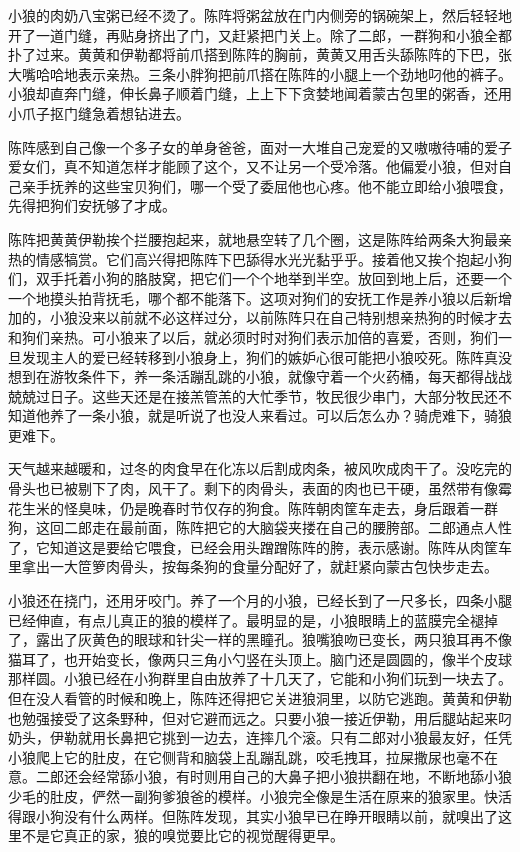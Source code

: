 \par 小狼的肉奶八宝粥已经不烫了。陈阵将粥盆放在门内侧旁的锅碗架上，然后轻轻地开了一道门缝，再贴身挤出了门，又赶紧把门关上。除了二郎，一群狗和小狼全都扑了过来。黄黄和伊勒都将前爪搭到陈阵的胸前，黄黄又用舌头舔陈阵的下巴，张大嘴哈哈地表示亲热。三条小胖狗把前爪搭在陈阵的小腿上一个劲地叼他的裤子。小狼却直奔门缝，伸长鼻子顺着门缝，上上下下贪婪地闻着蒙古包里的粥香，还用小爪子抠门缝急着想钻进去。
\par 陈阵感到自己像一个多子女的单身爸爸，面对一大堆自己宠爱的又嗷嗷待哺的爱子爱女们，真不知道怎样才能顾了这个，又不让另一个受冷落。他偏爱小狼，但对自己亲手抚养的这些宝贝狗们，哪一个受了委屈他也心疼。他不能立即给小狼喂食，先得把狗们安抚够了才成。
\par 陈阵把黄黄伊勒挨个拦腰抱起来，就地悬空转了几个圈，这是陈阵给两条大狗最亲热的情感犒赏。它们高兴得把陈阵下巴舔得水光光黏乎乎。接着他又挨个抱起小狗们，双手托着小狗的胳肢窝，把它们一个个地举到半空。放回到地上后，还要一个一个地摸头拍背抚毛，哪个都不能落下。这项对狗们的安抚工作是养小狼以后新增加的，小狼没来以前就不必这样过分，以前陈阵只在自己特别想亲热狗的时候才去和狗们亲热。可小狼来了以后，就必须时时对狗们表示加倍的喜爱，否则，狗们一旦发现主人的爱已经转移到小狼身上，狗们的嫉妒心很可能把小狼咬死。陈阵真没想到在游牧条件下，养一条活蹦乱跳的小狼，就像守着一个火药桶，每天都得战战兢兢过日子。这些天还是在接羔管羔的大忙季节，牧民很少串门，大部分牧民还不知道他养了一条小狼，就是听说了也没人来看过。可以后怎么办？骑虎难下，骑狼更难下。
\par 天气越来越暖和，过冬的肉食早在化冻以后割成肉条，被风吹成肉干了。没吃完的骨头也已被剔下了肉，风干了。剩下的肉骨头，表面的肉也已干硬，虽然带有像霉花生米的怪臭味，仍是晚春时节仅存的狗食。陈阵朝肉筐车走去，身后跟着一群狗，这回二郎走在最前面，陈阵把它的大脑袋夹搂在自己的腰胯部。二郎通点人性了，它知道这是要给它喂食，已经会用头蹭蹭陈阵的胯，表示感谢。陈阵从肉筐车里拿出一大笸箩肉骨头，按每条狗的食量分配好了，就赶紧向蒙古包快步走去。
\par 小狼还在挠门，还用牙咬门。养了一个月的小狼，已经长到了一尺多长，四条小腿已经伸直，有点儿真正的狼的模样了。最明显的是，小狼眼睛上的蓝膜完全褪掉了，露出了灰黄色的眼球和针尖一样的黑瞳孔。狼嘴狼吻已变长，两只狼耳再不像猫耳了，也开始变长，像两只三角小勺竖在头顶上。脑门还是圆圆的，像半个皮球那样圆。小狼已经在小狗群里自由放养了十几天了，它能和小狗们玩到一块去了。但在没人看管的时候和晚上，陈阵还得把它关进狼洞里，以防它逃跑。黄黄和伊勒也勉强接受了这条野种，但对它避而远之。只要小狼一接近伊勒，用后腿站起来叼奶头，伊勒就用长鼻把它挑到一边去，连摔几个滚。只有二郎对小狼最友好，任凭小狼爬上它的肚皮，在它侧背和脑袋上乱蹦乱跳，咬毛拽耳，拉屎撒尿也毫不在意。二郎还会经常舔小狼，有时则用自己的大鼻子把小狼拱翻在地，不断地舔小狼少毛的肚皮，俨然一副狗爹狼爸的模样。小狼完全像是生活在原来的狼家里。快活得跟小狗没有什么两样。但陈阵发现，其实小狼早已在睁开眼睛以前，就嗅出了这里不是它真正的家，狼的嗅觉要比它的视觉醒得更早。
